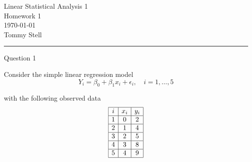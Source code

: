 \documentclass[12pt,letterpaper, onecolumn]{exam}
\begin{document}
\begingroup  
    \centering
    \LARGE Linear Statistical Analysis 1\\
    \LARGE Homework 1\\[0.5em]
    \large \today\\[0.5em]
    \large Tommy Stell\par
    
\endgroup
\rule{\textwidth}{0.4pt}
\pointsdroppedatright   %
\printanswers
\renewcommand{\solutiontitle}{\noindent\textbf{Ans:}\enspace}   %

\begin{questions}

    \question[8] Question 1\droppoints

    Consider the simple linear regression model
    \begin{equation*}
        Y_i = \beta_0 + \beta_1 x_i + \epsilon_i, \quad i=1,\ldots,5
    \end{equation*}

    with the following observed data
    \begin{equation*}
        \begin{array}{|c|c|c|}
           \hline i & x_i & y_i \\ \hline
            1 & 0 & 2 \\ \hline
            2 & 1 & 4 \\ \hline
            3 & 2 & 5 \\ \hline
            4 & 3 & 8 \\ \hline
            5 & 4 & 9 \\ \hline
        \end{array}
    \end{equation*}


\end{questions}
\end{document}
